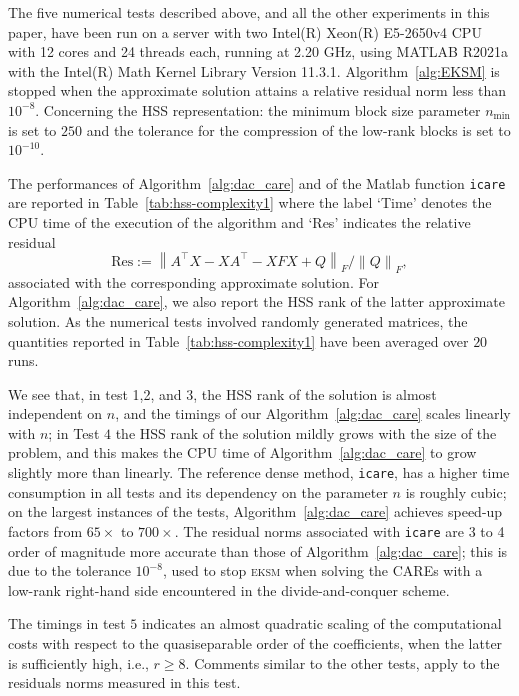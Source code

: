 \documentclass[a4paper,10pt]{article}
\newcommand{\norm}[1]{\left\lVert#1\right\rVert}
\begin{document}
The five numerical tests described above, and all the other experiments in this paper,  have been run on a server with two Intel(R) Xeon(R) E5-2650v4 CPU with 12 cores and 24 threads each, running at 2.20 GHz, using
MATLAB R2021a with the Intel(R) Math Kernel Library Version 11.3.1. Algorithm~\ref{alg:EKSM} is stopped when the approximate solution attains a relative residual norm less than $10^{-8}$. Concerning the HSS representation: the minimum
block size parameter $n_{\min}$ is set to $250$ and the tolerance for the compression of the low-rank blocks is set to $10^{-10}$.   

The performances of Algorithm~\ref{alg:dac_care} and of the Matlab function \texttt{icare} are reported in Table~\ref{tab:hss-complexity1} where the label `Time' denotes the CPU time of the execution of the algorithm and  `Res' indicates the relative residual 
$$\mathrm{Res}:=\norm{A^\top X-XA^\top-XFX+Q}_F/\norm{Q}_F,$$
associated with the corresponding approximate solution.
For Algorithm~\ref{alg:dac_care}, we also report the HSS rank of the latter approximate solution. As the numerical tests involved randomly generated matrices, the quantities reported in Table~\ref{tab:hss-complexity1} have been averaged over $20$ runs.

We see that, in test 1,2, and 3, the HSS rank of the solution is almost independent on $n$, and the timings of our Algorithm~\ref{alg:dac_care} scales linearly with $n$; in Test $4$ the HSS rank of the solution mildly grows with the size of the problem, and this makes the CPU time of Algorithm~\ref{alg:dac_care} to grow slightly more than linearly. The reference dense method, \texttt{icare}, has a higher time consumption in all tests and its dependency on the parameter $n$ is roughly cubic; on the largest instances of the tests, Algorithm~\ref{alg:dac_care} achieves  speed-up factors from $65\times$ to $700\times$. The residual norms associated with \texttt{icare} are 3 to 4 order of magnitude more accurate than those of Algorithm~\ref{alg:dac_care}; this is due to the tolerance $10^{-8}$, used to stop \textsc{eksm} when solving the CAREs with a low-rank right-hand side encountered in the divide-and-conquer scheme.  

The timings in test $5$ indicates an almost quadratic scaling of the computational costs with respect to the quasiseparable order of the coefficients, when the latter is sufficiently high, i.e., $r\ge 8$. Comments similar to the other tests, apply to the residuals norms measured in this test. 
  
\end{document}
